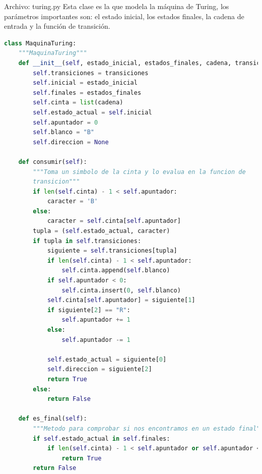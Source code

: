 Archivo: turing.py
Esta clase es la que modela la máquina de Turing, los parámetros importantes son: el estado inicial, los estados finales, la cadena de entrada y la función de transición.
\begin{lstlisting}[language=Python]
class MaquinaTuring:
    """MaquinaTuring"""
    def __init__(self, estado_inicial, estados_finales, cadena, transiciones):
        self.transiciones = transiciones
        self.inicial = estado_inicial
        self.finales = estados_finales
        self.cinta = list(cadena)
        self.estado_actual = self.inicial
        self.apuntador = 0
        self.blanco = "B"
        self.direccion = None

    def consumir(self):
        """Toma un simbolo de la cinta y lo evalua en la funcion de
        transicion"""
        if len(self.cinta) - 1 < self.apuntador:
            caracter = 'B'
        else:
            caracter = self.cinta[self.apuntador]
        tupla = (self.estado_actual, caracter)
        if tupla in self.transiciones:
            siguiente = self.transiciones[tupla]
            if len(self.cinta) - 1 < self.apuntador:
                self.cinta.append(self.blanco)
            if self.apuntador < 0:
                self.cinta.insert(0, self.blanco)
            self.cinta[self.apuntador] = siguiente[1]
            if siguiente[2] == "R":
                self.apuntador += 1
            else:
                self.apuntador -= 1

            self.estado_actual = siguiente[0]
            self.direccion = siguiente[2]
            return True
        else:
            return False

    def es_final(self):
        """Metodo para comprobar si nos encontramos en un estado final"""
        if self.estado_actual in self.finales:
            if len(self.cinta) - 1 < self.apuntador or self.apuntador < 0:
                return True
        return False
\end{lstlisting}

